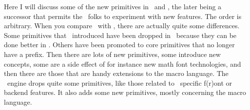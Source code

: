 


\startdocument[title=Primitives]

\pushoverloadmode


\startsection[title={Introduction}]

Here I will discuss some of the new primitives in \LUATEX\ and \LUAMETATEX, the
later being a successor that permits the \CONTEXT\ folks to experiment with new
features. The order is arbitrary. When you compare \LUATEX\ with \PDFTEX, there
are actually quite some differences. Some primitives that \PDFTEX\ introduced
have been dropped in \LUATEX\ because they can be done better in \LUA. Others
have been promoted to core primitives that no longer have a  prefix.
Then there are lots of new primitives, some introduce new concepts, some are a
side effect of for instance new math font technologies, and then there are those
that are handy extensions to the macro language. The \LUAMETATEX\ engine drops
quite some primitives, like those related to \PDFTEX\ specific f(r)ont or backend
features. It also adds some new primitives, mostly concerning the macro language.

